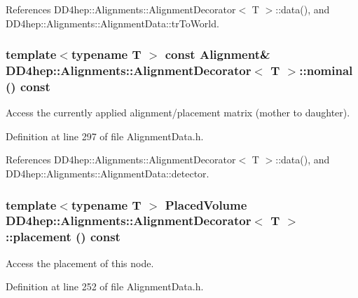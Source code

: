 References DD4hep::Alignments::AlignmentDecorator$<$ T $>$::data(), and DD4hep::Alignments::AlignmentData::trToWorld.\hypertarget{class_d_d4hep_1_1_alignments_1_1_alignment_decorator_ace3a885d09a36ac499b5261885fc6f9b}{
\subsubsection[{nominal}]{\setlength{\rightskip}{0pt plus 5cm}template$<$typename T $>$ const {\bf Alignment}\& {\bf DD4hep::Alignments::AlignmentDecorator}$<$ {\bf T} $>$::nominal () const}}
\label{class_d_d4hep_1_1_alignments_1_1_alignment_decorator_ace3a885d09a36ac499b5261885fc6f9b}


Access the currently applied alignment/placement matrix (mother to daughter). 

Definition at line 297 of file AlignmentData.h.

References DD4hep::Alignments::AlignmentDecorator$<$ T $>$::data(), and DD4hep::Alignments::AlignmentData::detector.\hypertarget{class_d_d4hep_1_1_alignments_1_1_alignment_decorator_a226538fa81c594913438a1507bff0af9}{
\subsubsection[{placement}]{\setlength{\rightskip}{0pt plus 5cm}template$<$typename T $>$ {\bf PlacedVolume} {\bf DD4hep::Alignments::AlignmentDecorator}$<$ {\bf T} $>$::placement () const}}
\label{class_d_d4hep_1_1_alignments_1_1_alignment_decorator_a226538fa81c594913438a1507bff0af9}


Access the placement of this node. 

Definition at line 252 of file AlignmentData.h.

